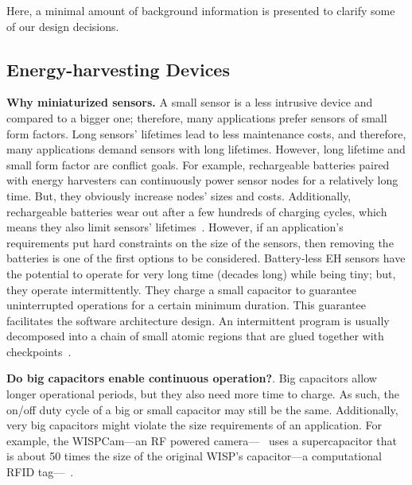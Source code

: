 Here, a minimal amount of background information is presented to clarify some of our design decisions. 

\subsection{Energy-harvesting Devices}

\noindent\textbf{ Why miniaturized sensors.} A small sensor is a less intrusive device and compared to a bigger one; therefore, many applications prefer sensors of small form factors.
Long sensors' lifetimes lead to less maintenance costs, and therefore, many applications demand sensors with long lifetimes. However, long lifetime and small form factor are conflict goals.
For example, rechargeable batteries paired with energy harvesters can continuously power sensor nodes for a relatively long time. But, 
they obviously increase nodes' sizes and costs. Additionally, rechargeable batteries wear out after a few hundreds of charging cycles, which means
they also limit sensors' lifetimes~\cite{aditya2008comparison}.  
%
However, if an application's requirements put hard constraints on the size of the sensors, then removing the batteries is one of the first options to be considered. 
Battery-less EH sensors have the potential to operate for very long time (decades long) while being tiny; but, they operate intermittently.  
%
They charge a small capacitor to guarantee uninterrupted operations for a certain minimum duration. 
This guarantee facilitates the software architecture design. An intermittent program is usually decomposed  into a chain of small atomic regions that  are  glued together with checkpoints~\cite{ransford2011mementos}. 

%
\noindent\textbf{Do big capacitors enable continuous operation?}. Big capacitors allow longer operational periods, but they also need more time to charge. 
As such, the on/off duty cycle of a big or small capacitor may still be the same. Additionally, very big capacitors might violate
the size requirements of an application. For example, the WISPCam---an RF powered camera---~\cite{naderiparizi2015wispcam} uses a supercapacitor that is about 50 times the size of the original WISP's capacitor---a computational RFID tag---~\cite{smith2006wirelessly}.


